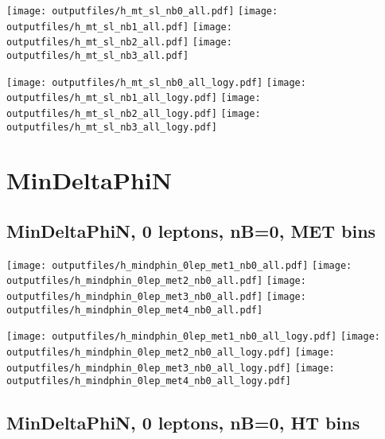 \documentclass[11pt]{article}
\begin{document}
    \noindent
     \texttt{[image: outputfiles/h\_mt\_sl\_nb0\_all.pdf]}
     \texttt{[image: outputfiles/h\_mt\_sl\_nb1\_all.pdf]}
     \texttt{[image: outputfiles/h\_mt\_sl\_nb2\_all.pdf]}
     \texttt{[image: outputfiles/h\_mt\_sl\_nb3\_all.pdf]}

    \noindent
     \texttt{[image: outputfiles/h\_mt\_sl\_nb0\_all\_logy.pdf]}
     \texttt{[image: outputfiles/h\_mt\_sl\_nb1\_all\_logy.pdf]}
     \texttt{[image: outputfiles/h\_mt\_sl\_nb2\_all\_logy.pdf]}
     \texttt{[image: outputfiles/h\_mt\_sl\_nb3\_all\_logy.pdf]}

    \clearpage






    \section{ MinDeltaPhiN }

    \subsection{ MinDeltaPhiN, 0 leptons, nB=0, MET bins }

    \noindent
     \texttt{[image: outputfiles/h\_mindphin\_0lep\_met1\_nb0\_all.pdf]}
     \texttt{[image: outputfiles/h\_mindphin\_0lep\_met2\_nb0\_all.pdf]}
     \texttt{[image: outputfiles/h\_mindphin\_0lep\_met3\_nb0\_all.pdf]}
     \texttt{[image: outputfiles/h\_mindphin\_0lep\_met4\_nb0\_all.pdf]}

    \noindent
     \texttt{[image: outputfiles/h\_mindphin\_0lep\_met1\_nb0\_all\_logy.pdf]}
     \texttt{[image: outputfiles/h\_mindphin\_0lep\_met2\_nb0\_all\_logy.pdf]}
     \texttt{[image: outputfiles/h\_mindphin\_0lep\_met3\_nb0\_all\_logy.pdf]}
     \texttt{[image: outputfiles/h\_mindphin\_0lep\_met4\_nb0\_all\_logy.pdf]}

    \clearpage



    \subsection{ MinDeltaPhiN, 0 leptons, nB=0, HT bins }
\end{document}
